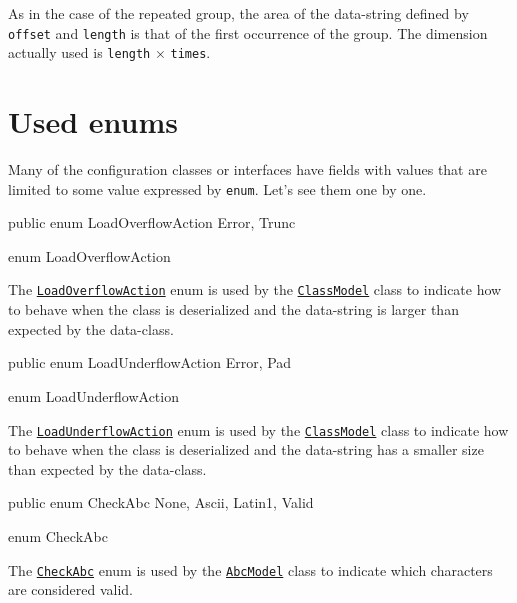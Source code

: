 As in the case of the repeated group, the area of the data-string defined by 
\verb!offset! and \verb!length! is that of the first occurrence of the group. 
The dimension actually used is \verb!length! $\times$ \verb!times!.

\vspace*{5cm}

\chapter{Used enums}
Many of the configuration classes or interfaces have fields with values that are 
limited to some value expressed by \texttt{enum}. 
Let's see them one by one.

\begin{elisting}
\begin{javacode}
public enum LoadOverflowAction { Error, Trunc }
\end{javacode}
\caption{enum LoadOverflowAction}\label{lst:LoadOverflowAction}
\end{elisting}
The \hyperref[lst:LoadOverflowAction]{\texttt{LoadOverflowAction}} enum is used 
by the \hyperref[lst:ClassModel]{\texttt{ClassModel}} class to indicate how to 
behave when the class is deserialized and the data-string is larger than 
expected by the data-class.

\begin{elisting}
\begin{javacode}
public enum LoadUnderflowAction { Error, Pad }
\end{javacode}
\caption{enum LoadUnderflowAction}\label{lst:LoadUnderflowAction}
\end{elisting}
The \hyperref[lst:LoadUnderflowAction]{\texttt{LoadUnderflowAction}} enum is 
used by the \hyperref[lst:ClassModel]{\texttt{ClassModel}} class to indicate how 
to behave when the class is deserialized and the data-string has a smaller size 
than expected by the data-class.

\begin{elisting}
\begin{javacode}
public enum CheckAbc { None, Ascii, Latin1, Valid }
\end{javacode}
\caption{enum CheckAbc}\label{lst:CheckAbc}
\end{elisting}
The \hyperref[lst:CheckAbc]{\texttt{CheckAbc}} enum is used by the 
\hyperref[lst:AbcModel]{\texttt{AbcModel}} class to indicate which characters 
are considered valid.

